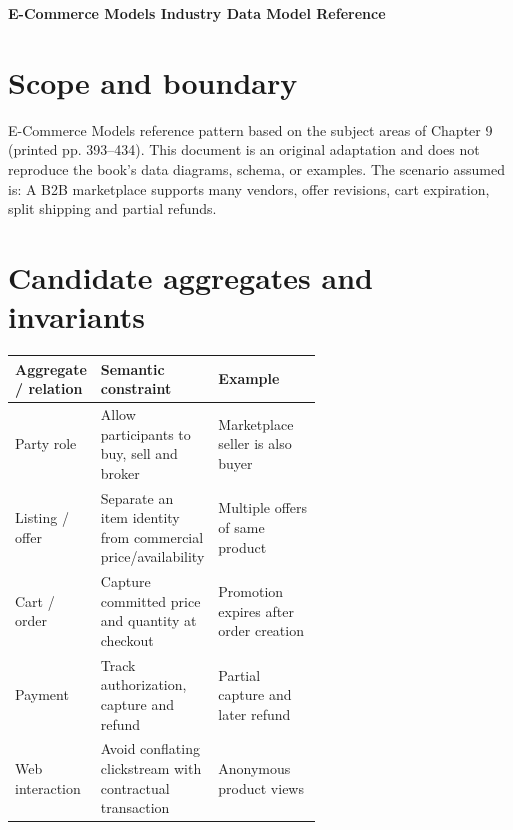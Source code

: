 \documentclass[11pt,letterpaper]{article}
\begin{document}
\begin{center}
{\LARGE\bfseries\color{navy} E-Commerce Models Industry Data Model Reference}\par
\vspace{0.25em}{\large Conceptual to logical reference | original adaptation}\par
{}
\end{center}
\vspace{0.8em}
\section{Scope and boundary}
E-Commerce Models reference pattern based on the subject areas of Chapter 9 (printed pp. 393--434). This document is an original adaptation and does not reproduce the book's data diagrams, schema, or examples. The scenario assumed is: A B2B marketplace supports many vendors, offer revisions, cart expiration, split shipping and partial refunds.


\section{Candidate aggregates and invariants}
\begin{tabularx}{\linewidth}{@{}>{\raggedright\arraybackslash}p{0.23\linewidth} >{\raggedright\arraybackslash}p{0.38\linewidth}>{\raggedright\arraybackslash}X@{}}
\toprule
\textbf{Aggregate / relation} & \textbf{Semantic constraint} & \textbf{Example} \\ 
\midrule
Party role & Allow participants to buy, sell and broker & Marketplace seller is also buyer \\ 
Listing / offer & Separate an item identity from commercial price/availability & Multiple offers of same product \\ 
Cart / order & Capture committed price and quantity at checkout & Promotion expires after order creation \\ 
Payment & Track authorization, capture and refund & Partial capture and later refund \\ 
Web interaction & Avoid conflating clickstream with contractual transaction & Anonymous product views \\ 
\bottomrule
\end{tabularx}
\end{document}
